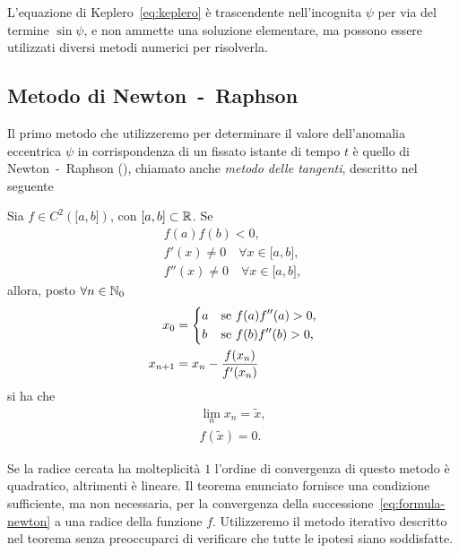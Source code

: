 L'equazione di Keplero~\eqref{eq:keplero} è trascendente nell'incognita $\psi$
per via del termine $\sin\psi$, e non ammette una soluzione elementare, ma
possono essere utilizzati diversi metodi numerici per risolverla.

\subsection{Metodo di Newton~-~Raphson}
\label{sec:newton}

Il primo metodo che utilizzeremo per determinare il valore dell'anomalia
eccentrica $\psi$ in corrispondenza di un fissato istante di tempo $t$ è quello
di Newton~-~Raphson (\textcite[30]{brugnano:calcolo-numerico}), chiamato anche
\emph{metodo delle tangenti}, descritto nel seguente
\begin{teorema}
  Sia $f\in C^2(\mathopen{[}a,b\mathclose{]})$, con
  $\mathopen{[}a,b\mathclose{]}\subset\mathbb{R}$. Se
  \begin{subequations}
    \begin{gather}
      f(a)f(b) <0, \label{eq:esistenza-zero}\\
      f'(x) \neq 0 \quad \forall x \in \mathopen{[}a,b\mathclose{]},\\
      f''(x) \neq 0 \quad \forall x \in \mathopen{[}a,b\mathclose{]},
    \end{gather}
  \end{subequations}
  allora, posto $\forall n \in \mathbb{N}_0$
  \begin{subequations}
    \begin{align}
      x_0 &=
      \begin{dcases}
        a & \text{se $f(a)f''(a)>0$,}\\
        b & \text{se $f(b)f''(b)>0$,}
      \end{dcases}\\
      x_{n+1} &= x_n - \frac{f(x_n)}{f'(x_n)} \label{eq:formula-newton}
    \end{align}
  \end{subequations}
  si ha che
  \begin{subequations}
    \begin{gather}
      \lim_n x_n = \tilde{x},\\
      f(\tilde{x}) = 0.
    \end{gather}
  \end{subequations}
\end{teorema}
Se la radice cercata ha molteplicità $1$ l'ordine di convergenza di questo
metodo è quadratico, altrimenti è lineare. Il teorema enunciato fornisce una
condizione sufficiente, ma non necessaria, per la convergenza della
successione~\eqref{eq:formula-newton} a una radice della funzione
$f$. Utilizzeremo il metodo iterativo descritto nel teorema senza preoccuparci
di verificare che tutte le ipotesi siano soddisfatte.

